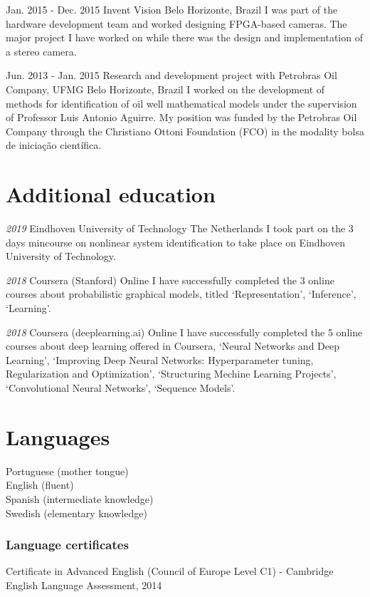 \documentclass[10pt,letterpaper]{article} %
\begin{document}
    { Jan. 2015 -   Dec. 2015 }
    { Invent Vision }
    { Belo Horizonte, Brazil }
    { I was part of the hardware development team and worked designing FPGA-based cameras. The major project I have worked on while there was the design and implementation of a stereo camera. }

    { Jun. 2013 -   Jan. 2015 }
    { Research and development project with Petrobras Oil Company, UFMG }
    { Belo Horizonte, Brazil }
    { I worked on the development of methods for identification of oil well mathematical models under the supervision of Professor Luis Antonio Aguirre. My position was funded by the Petrobras Oil Company through the Christiano Ottoni Foundation (FCO) in the modality bolsa de iniciação científica. }



\section*{Additional education}


    {\em  2019 }
    { Eindhoven University of Technology }
    { The Netherlands }
    { I took part on the 3 days mincourse on nonlinear system identification to take place on Eindhoven University of Technology. }

    {\em  2018 }
    { Coursera (Stanford) }
    { Online }
    { I have successfully completed the 3 online courses about probabilistic graphical models, titled `Representation', `Inference', `Learning'. }

    {\em  2018 }
    { Coursera (deeplearning.ai) }
    { Online }
    { I have successfully completed the 5 online courses about deep learning offered in Coursera, `Neural Networks and Deep Learning', `Improving Deep Neural Networks: Hyperparameter tuning, Regularization and Optimization', `Structuring Mechine Learning Projects', `Convolutional Neural Networks', `Sequence Models'. }


\section*{Languages}

Portuguese (mother tongue)\\
English (fluent)\\
Spanish (intermediate knowledge)\\
Swedish (elementary knowledge)

\subsubsection*{Language certificates}

Certificate in Advanced English (Council of Europe Level C1) - Cambridge English Language Assessment, 2014
\end{document}
